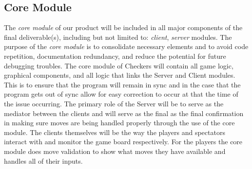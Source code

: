 \documentclass[letterpaper]{article}
\begin{document}
\subsection{Core Module}
\label{sec:architecture_system1}

The \emph{core module} of our product will be included in all
major components of the final deliverable(s), including but not
limited to: \emph{client}, \emph{server} modules. The purpose of
the \emph{core module} is to consolidate necessary elements and
to avoid code repetition, documentation redundancy, and reduce
the potential for future debugging troubles. The core module 
of Checkers will contain all game logic, graphical components,
and all logic that links the Server and Client modules. This is
to ensure that the program will remain in sync and in the case
that the program gets out of sync allow for easy correction to 
occur at that the time of the issue occurring. The primary role 
of the Server will be to serve as the mediator between the
clients and will serve as the final as the final confirmation in
making sure moves are being handled properly through the use of
the core module. The clients themselves will be the way the
players and spectators interact with and monitor the game board
respectively. For the players the core module does move
validation to show what moves they have available and handles
all of their inputs.

\end{document}
